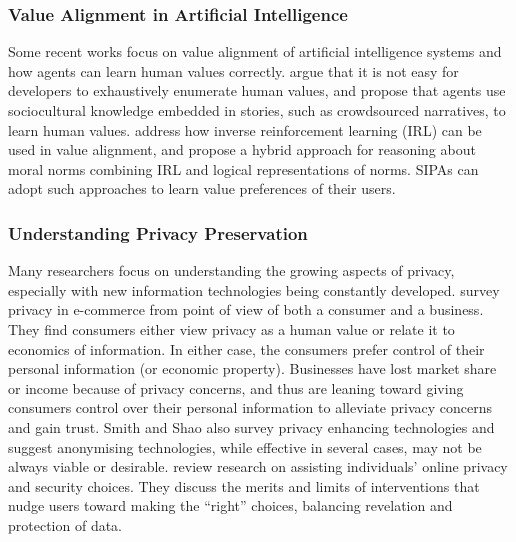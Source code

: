 \subsubsection{Value Alignment in Artificial Intelligence}

Some recent works focus on value alignment of artificial intelligence systems and how agents can learn human values correctly. 
\citet{RiedlHarrison2016Stories} argue that it is not easy for developers to exhaustively enumerate human values, and propose that agents use sociocultural knowledge embedded in stories, such as crowdsourced narratives, to learn human values. 
\citet{arnold-2017-value} address how inverse reinforcement learning (IRL) can be used in value alignment, and propose a hybrid approach for reasoning about moral norms combining IRL and logical representations of norms. \frameworkAinur SIPAs can adopt such approaches to learn value preferences of their users. 


\subsubsection{Understanding Privacy Preservation}

Many researchers focus on understanding the growing aspects of privacy, especially with new information technologies being constantly developed. 
% 
\citet{smith2007privacy} survey privacy in e-commerce from point of view of both a consumer and a business. 
They find consumers either view privacy as a human value or relate it to economics of information. 
In either case, the consumers prefer control of their personal information (or economic property). 
Businesses have lost market share or income because of privacy concerns, 
and thus are leaning toward giving consumers control over their personal information to alleviate privacy concerns and gain trust.  
Smith and Shao also survey privacy enhancing technologies and suggest anonymising technologies, while effective in several cases, may not be always viable or desirable. 
\citet{Acquisti-2017-Nudges+Privacy+Security} review research on assisting individuals' online privacy and security choices. 
They discuss the merits and limits of interventions that nudge users toward making the ``right'' choices, balancing revelation and protection of data. 

